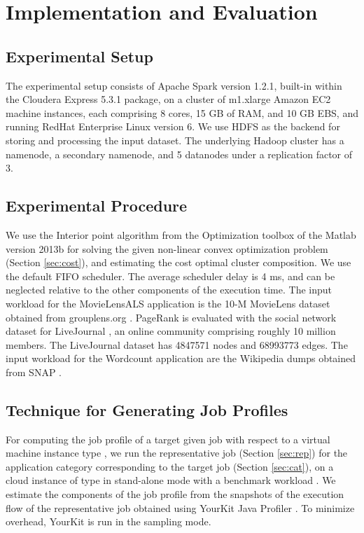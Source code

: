 \documentclass[conference]{IEEEtran}
\begin{document}
%
 
\section{Implementation and Evaluation}\label{sec:evaluation}


\subsection{Experimental Setup}\label{sec:setup}
 The experimental setup consists of Apache Spark version 1.2.1, built-in within the Cloudera Express 5.3.1 package, on a
  cluster of m1.xlarge Amazon EC2 machine instances, each comprising 8 cores, 15 GB of RAM, and 10 GB EBS, and
  running RedHat Enterprise Linux version 6.
   We use HDFS as the backend for storing and processing the input dataset. The underlying Hadoop cluster has a namenode, a secondary namenode, and
5 datanodes under a replication factor of 3. \subsection{Experimental Procedure}\label{sec:procedure}
We use the Interior point algorithm \cite{leader2004numerical} from the Optimization toolbox of the Matlab version 2013b for solving the given non-linear convex optimization problem (Section \ref{sec:cost}), and estimating the cost optimal cluster composition. We use the default FIFO scheduler. The average scheduler delay is
 4 ms, and can be neglected relative to the other components of the execution time.
     The input workload for
the MovieLensALS application is the 10-M MovieLens dataset obtained from grouplens.org \cite{MOVIELENS-DATA}.
 PageRank is evaluated with the social network dataset for LiveJournal \cite{snapnets}, an online community comprising roughly 10 million members. The LiveJournal dataset has 4847571 nodes and 68993773 edges. The input workload for the Wordcount application are the Wikipedia dumps obtained from SNAP \cite{snapnets}.


\subsection{Technique for Generating Job Profiles}\label{sec:tech}
For computing the job profile of a target given
 job  with respect to a virtual machine instance type , we run the representative job  (Section \ref{sec:rep}) for the
 application category corresponding to the target job  (Section \ref{sec:cat}), on a cloud instance of type  in stand-alone mode with a benchmark workload \cite{Pavlo:2009:CAL:1559845.1559865}. We estimate the components of the job profile from the snapshots of the execution flow of the representative
   job obtained using YourKit Java Profiler \cite{YKfJ07}. To minimize overhead, YourKit is run in the sampling mode. 
\end{document}
